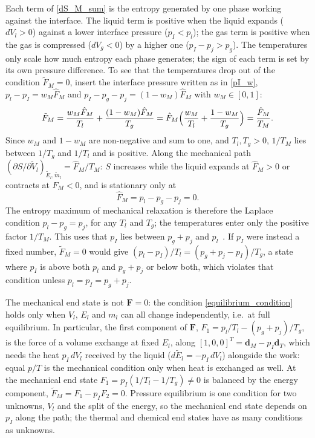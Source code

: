 Each term of \eqref{dS_M_sum} is the entropy generated by one phase working against the interface. The liquid term is positive when the liquid expands ($dV_l>0$) against a lower interface pressure ($p_I<p_l$); the gas term is positive when the gas is compressed ($dV_g<0$) by a higher one ($p_I-p_{j}>p_g$). The temperatures only scale how much entropy each phase generates; the sign of each term is set by its own pressure difference. To see that the temperatures drop out of the condition $\tilde{F}_M=0$, insert the interface pressure written as in \eqref{pI_w}, $p_l-p_I=w_M\hat{F}_M$ and $p_I-p_g-p_{j}=(1-w_M)\hat{F}_M$ with $w_M\in[0,1]$:
\begin{equation}\label{fM_steps}
\tilde{F}_M=\frac{w_M\hat{F}_M}{T_l}+\frac{(1-w_M)\hat{F}_M}{T_g}=\hat{F}_M\Bigl(\frac{w_M}{T_l}+\frac{1-w_M}{T_g}\Bigr)=\frac{\hat{F}_M}{T_M}.
\end{equation}
Since $w_M$ and $1-w_M$ are non-negative and sum to one, and $T_l,T_g>0$, $1/T_M$ lies between $1/T_g$ and $1/T_l$ and is positive. Along the mechanical path $(\partial S/\partial\tilde{V}_l)_{\tilde{E}_l,\tilde{m}_l}=\hat{F}_M/T_M$: $S$ increases while the liquid expands at $\hat{F}_M>0$ or contracts at $\hat{F}_M<0$, and is stationary only at
\begin{equation}
\hat{F}_M=p_l-p_g-p_{j}=0 .
\end{equation}
The entropy maximum of mechanical relaxation is therefore the Laplace condition $p_l-p_g=p_{j}$, for any $T_l$ and $T_g$; the temperatures enter only the positive factor $1/T_M$. This uses that $p_I$ lies between $p_g+p_{j}$ and $p_l$~\cite[eq.~(3)]{Pelanti2022}. If $p_I$ were instead a fixed number, $\tilde{F}_M=0$ would give $(p_l-p_I)/T_l=(p_g+p_{j}-p_I)/T_g$, a state where $p_I$ is above both $p_l$ and $p_g+p_{j}$ or below both, which violates that condition unless $p_l=p_I=p_g+p_{j}$.

The mechanical end state is not $\boldsymbol{F}=0$: the condition \eqref{equilibrium_condition} holds only when $V_l$, $E_l$ and $m_l$ can all change independently, i.e.\ at full equilibrium. In particular, the first component of $\boldsymbol{F}$, $F_1=p_l/T_l-(p_g+p_{j})/T_g$, is the force of a volume exchange at fixed $E_l$, along $[1,0,0]^T=\boldsymbol{d}_M-p_I\boldsymbol{d}_T$, which needs the heat $p_I\,dV_l$ received by the liquid ($d\tilde{E}_l=-p_I\,dV_l$) alongside the work: equal $p/T$ is the mechanical condition only when heat is exchanged as well. At the mechanical end state $F_1=p_I(1/T_l-1/T_g)\neq0$ is balanced by the energy component, $\tilde{F}_M=F_1-p_IF_2=0$. Pressure equilibrium is one condition for two unknowns, $V_l$ and the split of the energy, so the mechanical end state depends on $p_I$ along the path; the thermal and chemical end states have as many conditions as unknowns.

